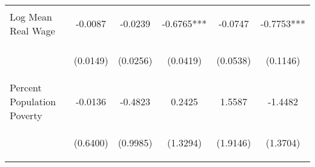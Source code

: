 \begin{center}
\begin{tabular}{lccccc}
\noalign{\smallskip}Log Mean Real Wage & \begin{scriptsize}-0.0087\end{scriptsize} & \begin{scriptsize}-0.0239\end{scriptsize} & \begin{scriptsize}-0.6765***\end{scriptsize} & \begin{scriptsize}-0.0747\end{scriptsize} & \begin{scriptsize}-0.7753***\end{scriptsize}\\
 & \begin{scriptsize}(0.0149)\end{scriptsize} & \begin{scriptsize}(0.0256)\end{scriptsize} & \begin{scriptsize}(0.0419)\end{scriptsize} & \begin{scriptsize}(0.0538)\end{scriptsize} & \begin{scriptsize}(0.1146)\end{scriptsize}\\
\noalign{\smallskip}Percent Population Poverty & \begin{scriptsize}-0.0136\end{scriptsize} & \begin{scriptsize}-0.4823\end{scriptsize} & \begin{scriptsize}0.2425\end{scriptsize} & \begin{scriptsize}1.5587\end{scriptsize} & \begin{scriptsize}-1.4482\end{scriptsize}\\
 & \begin{scriptsize}(0.6400)\end{scriptsize} & \begin{scriptsize}(0.9985)\end{scriptsize} & \begin{scriptsize}(1.3294)\end{scriptsize} & \begin{scriptsize}(1.9146)\end{scriptsize} & \begin{scriptsize}(1.3704)\end{scriptsize}\\

\end{tabular}
\end{center}
